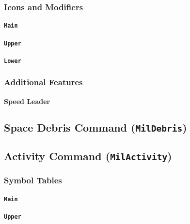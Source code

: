 \documentclass[a4paper, titlepage]{article}
\begin{document}
\subsubsection{Icons and Modifiers}

\paragraph{\texttt{Main}}
%

\paragraph{\texttt{Upper}}
%

\paragraph{\texttt{Lower}}
%

\subsubsection{Additional Features}

\paragraph{Speed Leader}

\subsection{Space Debris Command (\textbf{\texttt{MilDebris}})}

\subsection{Activity Command (\textbf{\texttt{MilActivity}})}

\subsubsection{Symbol Tables}

\paragraph{\texttt{Main}}
%

\paragraph{\texttt{Upper}}
%
\end{document}
